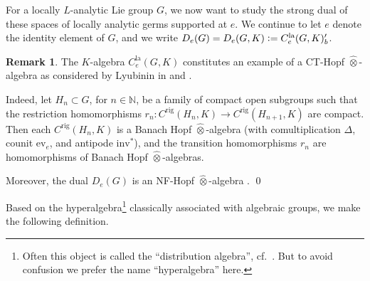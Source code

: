 \documentclass[a4paper, reqno, 10pt]{amsart}
\theoremstyle{definition}
\newtheorem{remark}[theorem]{Remark}
\numberwithin{equation}{section}
\newcommand{\defeq}{\vcentcolon=}
\newcommand{\ev}{{\mathrm{ev}}}
\newcommand{\inv}{{\mathrm{inv}}}
\newcommand{\la}{{\mathrm{la}}}
\newcommand{\ra}{\rightarrow}
\newcommand{\BN}{{\mathbb {N}}}
\newcommand{\aan}{{\mathrm{rig}}}
\begin{document}
For a locally $L$-analytic Lie group $G$, we now want to study the strong dual of these spaces of locally analytic germs supported at $e$.
We continue to let $e$ denote the identity element of $G$, and we write $D_e(G) = D_e(G,K) \defeq C^\la_e(G,K)'_b$.


\begin{remark}
	The $K$-algebra $C^\la_e(G,K)$ constitutes an example of a CT-Hopf $\widehat{\otimes}$-algebra as considered by Lyubinin in \cite[Ch.\ 3.1.2]{Lyubinin10ModComodNonArchHopfAlg} and \cite[Ch.\ 3.2]{Lyubinin14NonArchCoAlgCoadmMod}.
	
	
	Indeed, let $H_n \subset G$, for $n\in \BN$, be a family of compact open subgroups such that the restriction homomorphisms $r_n \colon C^\aan (H_n,K)\ra C^\aan(H_{n+1},K)$ are compact.
	Then each $C^\aan (H_n,K)$ is a Banach Hopf $\widehat{\otimes}$-algebra (with comultiplication $\Delta$, counit $\ev_e$, and antipode $\inv^\ast$), and the transition homomorphisms $r_n$ are homomorphisms of Banach Hopf $\widehat{\otimes}$-algebras.
	
	
	Moreover, the dual $D_e(G)$ is an NF-Hopf $\widehat{\otimes}$-algebra \cite[Prop. 3.13]{Lyubinin14NonArchCoAlgCoadmMod}.
	\qed
\end{remark}





Based on the hyperalgebra\footnote{Often this object is called the ``distribution algebra'', cf.\ \cite[I.\ Ch.7]{Jantzen03RepAlgGrp}. But to avoid confusion we prefer the name ``hyperalgebra'' here.} classically associated with algebraic groups, we make the following definition.
\end{document}
